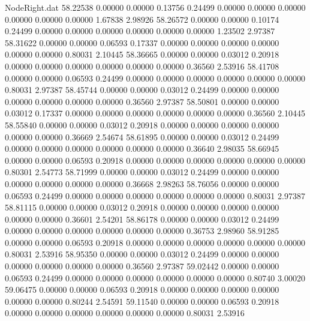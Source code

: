 \begin{filecontents}{NodeRight.dat}
  58.22538    0.00000    0.00000     0.13756    0.24499    0.00000    0.00000    0.00000    0.00000    0.00000    0.00000    1.67838    2.98926
  58.26572    0.00000    0.00000     0.10174    0.24499    0.00000    0.00000    0.00000    0.00000    0.00000    0.00000    1.23502    2.97387
  58.31622    0.00000    0.00000     0.06593    0.17337    0.00000    0.00000    0.00000    0.00000    0.00000    0.00000    0.80031    2.10445
  58.36665    0.00000    0.00000     0.03012    0.20918    0.00000    0.00000    0.00000    0.00000    0.00000    0.00000    0.36560    2.53916
  58.41708    0.00000    0.00000     0.06593    0.24499    0.00000    0.00000    0.00000    0.00000    0.00000    0.00000    0.80031    2.97387
  58.45744    0.00000    0.00000     0.03012    0.24499    0.00000    0.00000    0.00000    0.00000    0.00000    0.00000    0.36560    2.97387
  58.50801    0.00000    0.00000     0.03012    0.17337    0.00000    0.00000    0.00000    0.00000    0.00000    0.00000    0.36560    2.10445
  58.55840    0.00000    0.00000     0.03012    0.20918    0.00000    0.00000    0.00000    0.00000    0.00000    0.00000    0.36669    2.54674
  58.61895    0.00000    0.00000     0.03012    0.24499    0.00000    0.00000    0.00000    0.00000    0.00000    0.00000    0.36640    2.98035
  58.66945    0.00000    0.00000     0.06593    0.20918    0.00000    0.00000    0.00000    0.00000    0.00000    0.00000    0.80301    2.54773
  58.71999    0.00000    0.00000     0.03012    0.24499    0.00000    0.00000    0.00000    0.00000    0.00000    0.00000    0.36668    2.98263
  58.76056    0.00000    0.00000     0.06593    0.24499    0.00000    0.00000    0.00000    0.00000    0.00000    0.00000    0.80031    2.97387
  58.81115    0.00000    0.00000     0.03012    0.20918    0.00000    0.00000    0.00000    0.00000    0.00000    0.00000    0.36601    2.54201
  58.86178    0.00000    0.00000     0.03012    0.24499    0.00000    0.00000    0.00000    0.00000    0.00000    0.00000    0.36753    2.98960
  58.91285    0.00000    0.00000     0.06593    0.20918    0.00000    0.00000    0.00000    0.00000    0.00000    0.00000    0.80031    2.53916
  58.95350    0.00000    0.00000     0.03012    0.24499    0.00000    0.00000    0.00000    0.00000    0.00000    0.00000    0.36560    2.97387
  59.02442    0.00000    0.00000     0.06593    0.24499    0.00000    0.00000    0.00000    0.00000    0.00000    0.00000    0.80740    3.00020
  59.06475    0.00000    0.00000     0.06593    0.20918    0.00000    0.00000    0.00000    0.00000    0.00000    0.00000    0.80244    2.54591
  59.11540    0.00000    0.00000     0.06593    0.20918    0.00000    0.00000    0.00000    0.00000    0.00000    0.00000    0.80031    2.53916

\end{filecontents}
